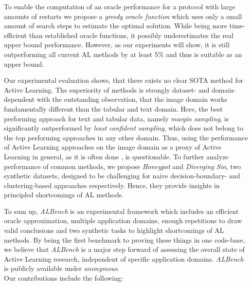 \documentclass[]{article}
\begin{document}
To enable the computation of an oracle performance for a protocol with large amounts of restarts
we propose a \emph{greedy oracle function} 
which uses only a small amount of search steps to estimate the
optimal solution. While being more time-efficient than established oracle
functions, it possibly underestimates the real upper bound performance. 
However, as our experiments will show, it is still outperforming all current AL methods
by at least 5\% and thus is suitable as an upper bound.

Our experimental evaluation shows, that there exists no clear SOTA
method for Active Learning. The superiority of methods is strongly dataset- and
domain-dependent with the outstanding observation, that the image domain works
fundamentally different than the tabular and text domain. Here, the best
performing approach for text and tabular data, namely \emph{margin sampling}, is
significantly outperformed by \emph{least confident sampling}, which does not belong to
the top performing approaches in any other domain. Thus, using the performance
of Active Learning approaches on the image domain as a proxy of Active Learning
in general, as it is often done \cite{beck2021effective, munjal2022towards, li2022empirical, ji2023randomness, luth2024navigating}, is questionable. To further analyze
performance of common methods, we propose \emph{Honeypot} and \emph{Diverging Sin}, two
synthetic datasets, designed to be challenging for naive decision-boundary- and clustering-based approaches respectively. Hence, they provide insights in principled shortcomings of AL methods.

To sum up, \emph{ALBench} is an experimental framework which includes an
efficient oracle approximation, multiple application domains, enough repetitions to
draw valid conclusions and two synthetic tasks to highlight shortcomings of AL methods. 
By being the first benchmark to proving these things in one code-base, 
we believe that \emph{ALBench} is a major step forward of assessing the overall state of Active Learning research, independent of
specific application domains. \emph{ALBench} is publicly available under \emph{anonymous}. \\ [1mm]
Our contributions include the following:
\end{document}
